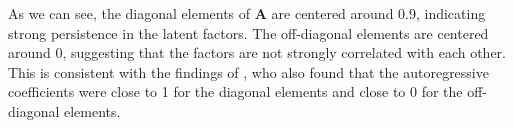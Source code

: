 As we can see, the diagonal elements of $\mathbf{A}$ are centered around 0.9, indicating strong persistence in the latent factors. The off-diagonal elements are centered around 0, suggesting that the factors are not strongly correlated with each other. This is consistent with the findings of \citet{diebold2006macroeconomy}, who also found that the autoregressive coefficients were close to 1 for the diagonal elements and close to 0 for the off-diagonal elements.